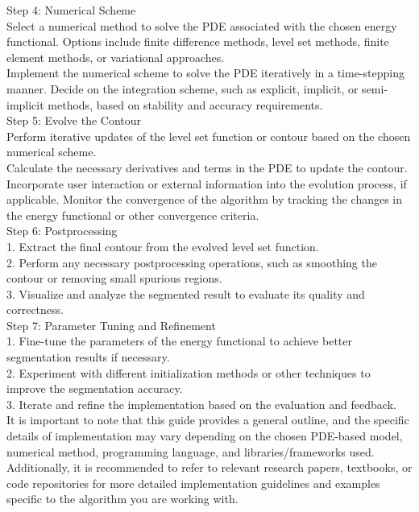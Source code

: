 \documentclass[]{report}
\begin{document}
Step 4: Numerical Scheme\\

Select a numerical method to solve the PDE associated with the chosen energy functional. Options include finite difference methods, level set methods, finite element methods, or variational approaches.\\
Implement the numerical scheme to solve the PDE iteratively in a time-stepping manner.
Decide on the integration scheme, such as explicit, implicit, or semi-implicit methods, based on stability and accuracy requirements.\\

Step 5: Evolve the Contour\\

Perform iterative updates of the level set function or contour based on the chosen numerical scheme.\\
Calculate the necessary derivatives and terms in the PDE to update the contour.
Incorporate user interaction or external information into the evolution process, if applicable.
Monitor the convergence of the algorithm by tracking the changes in the energy functional or other convergence criteria.\\
Step 6: Postprocessing\\

1. Extract the final contour from the evolved level set function.\\
2. Perform any necessary postprocessing operations, such as smoothing the contour or removing 
   small spurious regions.\\
3. Visualize and analyze the segmented result to evaluate its quality and correctness.\\
Step 7: Parameter Tuning and Refinement\\

1. Fine-tune the parameters of the energy functional to achieve better segmentation results if 
   necessary.\\
2. Experiment with different initialization methods or other techniques to improve the segmentation accuracy.\\
3. Iterate and refine the implementation based on the evaluation and feedback.\\

It is important to note that this guide provides a general outline, and the specific details of implementation may vary depending on the chosen PDE-based model, numerical method, programming language, and libraries/frameworks used. Additionally, it is recommended to refer to relevant research papers, textbooks, or code repositories for more detailed implementation guidelines and examples specific to the algorithm you are working with.\\
\end{document}
